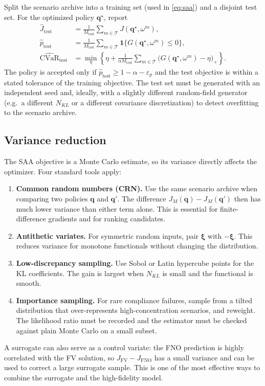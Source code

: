 \documentclass[11pt]{article}
\numberwithin{equation}{section}
\newcommand{\CVaR}{\operatorname{CVaR}}
\newcommand{\ind}{\mathbf{1}}
\theoremstyle{plain}
\begin{document}
Split the scenario archive into a training set (used in \eqref{eq:saa}) and a
disjoint test set.  For the optimized policy $\mathbf{q}^\star$, report
\begin{align}
\hat J_{\mathrm{test}}
&=\frac{1}{M_{\mathrm{test}}}\sum_{m\in\mathcal{T}}
J(\mathbf{q}^\star,\omega^m),
\label{eq:Jtest}\\
\hat p_{\mathrm{test}}
&=\frac{1}{M_{\mathrm{test}}}\sum_{m\in\mathcal{T}}
\ind\{G(\mathbf{q}^\star,\omega^m)\le0\},
\label{eq:ptest}\\
\widehat{\CVaR}_{\mathrm{test}}
&=\min_{\eta}\left\{\eta+\frac{1}{\alpha M_{\mathrm{test}}}
\sum_{m\in\mathcal{T}}\bigl(G(\mathbf{q}^\star,\omega^m)-\eta\bigr)_+
\right\}.
\label{eq:cvartest}
\end{align}
The policy is accepted only if $\hat p_{\mathrm{test}}\ge1-\alpha-\varepsilon_p$
and the test objective is within a stated tolerance of the training objective.
The test set must be generated with an independent seed and, ideally, with a
slightly different random-field generator (e.g.\ a different $N_{KL}$ or a
different covariance discretization) to detect overfitting to the scenario
archive.

\subsection{Variance reduction}
\label{sec:variance}

The SAA objective is a Monte Carlo estimate, so its variance directly affects
the optimizer.  Four standard tools apply:
\begin{enumerate}[leftmargin=1.6em,itemsep=2pt]
  \item \textbf{Common random numbers (CRN).}  Use the same scenario archive
        when comparing two policies $\mathbf{q}$ and $\mathbf{q}'$.  The
        difference $J_M(\mathbf{q})-J_M(\mathbf{q}')$ then has much lower
        variance than either term alone.  This is essential for finite-
        difference gradients and for ranking candidates.
  \item \textbf{Antithetic variates.}  For symmetric random inputs, pair
        $\bm{\xi}$ with $-\bm{\xi}$.  This reduces variance for monotone
        functionals without changing the distribution.
  \item \textbf{Low-discrepancy sampling.}  Use Sobol or Latin hypercube points
        for the KL coefficients.  The gain is largest when $N_{KL}$ is small
        and the functional is smooth.
  \item \textbf{Importance sampling.}  For rare compliance failures, sample
        from a tilted distribution that over-represents high-concentration
        scenarios, and reweight.  The likelihood ratio must be recorded and
        the estimator must be checked against plain Monte Carlo on a small
        subset.
\end{enumerate}
A surrogate can also serve as a control variate: the FNO prediction is highly
correlated with the FV solution, so
$J_{\mathrm{FV}}-J_{\mathrm{FNO}}$ has a small variance and can be used to
correct a large surrogate sample.  This is one of the most effective ways to
combine the surrogate and the high-fidelity model.
\end{document}
